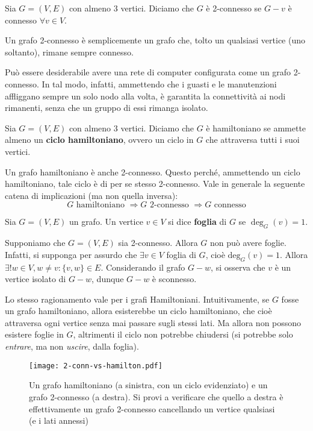 \begin{tcolorbox}[colback=yellow!30, colframe=yellow!30!black, title=Grafo 2-connesso]
Sia $G=(V,E)$ con almeno 3 vertici. Diciamo che $G$ è 2-connesso se $G-v$ è
connesso $\forall v \in V$.
\end{tcolorbox}

Un grafo 2-connesso è semplicemente un grafo che, tolto un
qualsiasi vertice (uno soltanto), rimane sempre connesso.

Può essere desiderabile avere una rete di computer configurata
come un grafo 2-connesso. In tal modo, infatti, ammettendo che
i guasti e le manutenzioni affliggano sempre un solo nodo alla
volta, è garantita la connettività ai nodi rimanenti, senza che
un gruppo di essi rimanga isolato.

\begin{tcolorbox}[colback=yellow!30, colframe=yellow!30!black, title=Grafo Hamiltoniano]
Sia $G=(V,E)$ con almeno 3 vertici. Diciamo che $G$ è hamiltoniano se ammette
almeno un \textbf{ciclo hamiltoniano}, ovvero un ciclo in $G$ che attraversa
tutti i suoi vertici.
\end{tcolorbox}
\noindent Un grafo hamiltoniano è anche 2-connesso. Questo perché,
ammettendo un ciclo hamiltoniano, tale ciclo è di per se stesso
2-connesso.
Vale in generale la seguente catena di implicazioni (ma non quella inversa):
\[ G \text{ hamiltoniano } \Longrightarrow G \text{ 2-connesso } \Longrightarrow G \text{ connesso} \]
\begin{tcolorbox}[colback=yellow!30, colframe=yellow!30!black, title=Foglia]
Sia $G=(V,E)$ un grafo. Un vertice $v\in V$ si dice \textbf{foglia} di $G$
se $\deg_G(v)=1$.
\end{tcolorbox}
\noindent Supponiamo che $G=(V,E)$ sia 2-connesso. Allora $G$ non
può avere foglie. Infatti, si supponga per assurdo che $\exists v\in V$
foglia di $G$, cioè $\text{deg}_G(v)=1$. Allora $\exists!w\in V,w\not=v:\{v,w\}\in E$.
Considerando il grafo $G-w$, si osserva che $v$ è un vertice isolato di
$G-w$, dunque $G-w$ è sconnesso.
\begin{osservaz}
Lo stesso ragionamento vale per i grafi Hamiltoniani. Intuitivamente,
se $G$ fosse un grafo hamiltoniano, allora esisterebbe un ciclo hamiltoniano,
che cioè attraversa ogni vertice senza mai passare sugli stessi lati.
Ma allora non possono esistere foglie in $G$, altrimenti il ciclo
non potrebbe chiudersi (si potrebbe solo \emph{entrare}, ma non \emph{uscire}, dalla
foglia).
\end{osservaz}

\begin{figure}[H]
\centering
\texttt{[image: 2-conn-vs-hamilton.pdf]}
\caption{Un grafo hamiltoniano (a sinistra, con un ciclo evidenziato) e un grafo 2-connesso (a destra).
Si provi a verificare che quello a destra è effettivamente un grafo 2-connesso
cancellando un vertice qualsiasi (e i lati annessi)}
\end{figure}